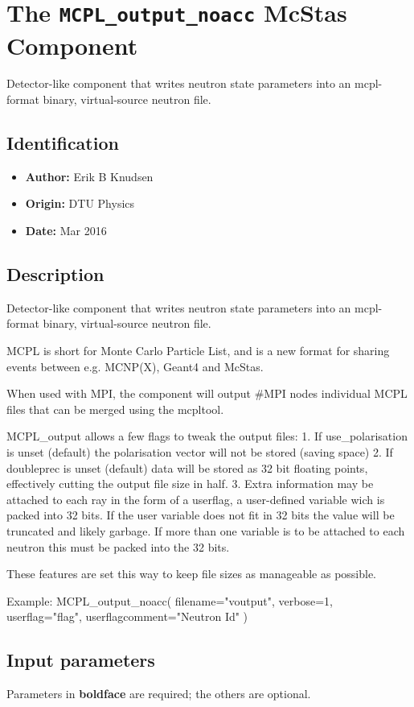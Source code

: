 \section{The \texttt{MCPL\_output\_noacc} McStas Component}
Detector-like component that writes neutron state parameters into an mcpl-format
binary, virtual-source neutron file.

\subsection*{Identification}
\begin{itemize}
  \item \textbf{Author:} Erik B Knudsen
  \item \textbf{Origin:} DTU Physics
  \item \textbf{Date:} Mar 2016
\end{itemize}

\subsection*{Description}
Detector-like component that writes neutron state parameters into an mcpl-format binary, virtual-source neutron file.

MCPL is short for Monte Carlo Particle List, and is a new format for sharing events between e.g. MCNP(X), Geant4 and McStas.

When used with MPI, the component will output \#MPI nodes individual MCPL files that can be merged using the mcpltool.

MCPL\_output allows a few flags to tweak the output files: 1. If use\_polarisation is unset (default) the polarisation vector will not be stored (saving space) 2. If doubleprec is unset (default) data will be stored as 32 bit floating points, effectively cutting the output file size in half. 3. Extra information may be attached to each ray in the form of a userflag, a user-defined variable wich is packed into 32 bits. If the user variable does not fit in 32 bits the value will be truncated and likely garbage. If more than one variable is to be attached to each neutron this must be packed into the 32 bits.

These features are set this way to keep file sizes as manageable as possible.

Example: MCPL\_output\_noacc( filename="voutput", verbose=1, userflag="flag", userflagcomment="Neutron Id" )

\subsection*{Input parameters}
Parameters in \textbf{boldface} are required; the others are optional.

